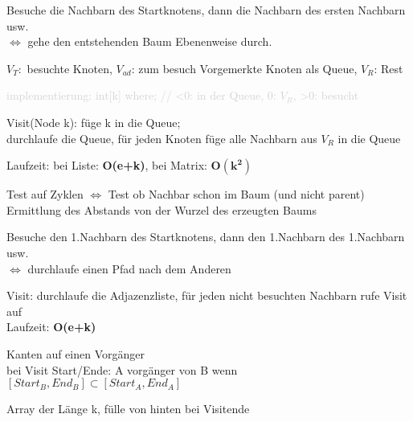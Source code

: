 Besuche die Nachbarn des Startknotens, dann die Nachbarn des ersten Nachbarn usw.\\
$\Leftrightarrow$ gehe den entstehenden Baum Ebenenweise durch.

$V_T:$ besuchte Knoten, $V_{ad}$: zum besuch Vorgemerkte Knoten als Queue, $V_R$: Rest

\textcolor{lightgray}{implementierung: int[k] where; // <0: in der Queue, 0: $V_R$, >0: besucht }%

Visit(Node k): füge k in die Queue;\\
durchlaufe die Queue, für jeden Knoten füge alle Nachbarn aus $V_R$ in die Queue

Laufzeit: bei Liste:\textbf{ O(e+k)}, bei Matrix: $\mathbf{O(k^2)}$

 Test auf Zyklen $\Leftrightarrow$ Test ob Nachbar schon im Baum (und nicht parent)\\
Ermittlung des Abstands von der Wurzel des erzeugten Baums


Besuche den 1.Nachbarn des Startknotens, dann den 1.Nachbarn des 1.Nachbarn usw.\\
$\Leftrightarrow$ durchlaufe einen Pfad nach dem Anderen

Visit: durchlaufe die Adjazenzliste, für jeden nicht besuchten Nachbarn rufe Visit auf\\
Laufzeit: \textbf{O(e+k)}


 Kanten auf einen Vorgänger\\
bei Visit Start/Ende: A vorgänger von B wenn $[Start_B,End_B] \subset  [Start_A,End_A]$

 Array der Länge k, fülle von hinten bei Visitende\\

\newpage
{}


